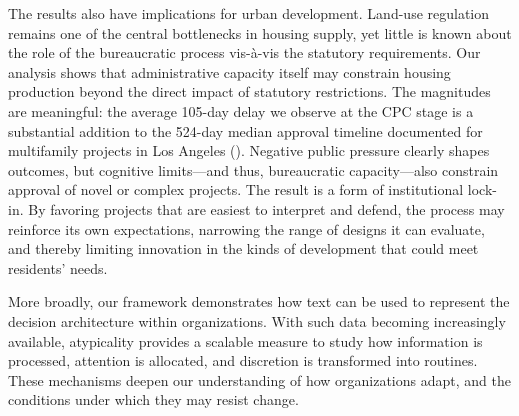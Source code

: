 The results also have implications for urban development. Land-use regulation remains one of the central bottlenecks in housing supply, yet little is known about the role of the bureaucratic process vis-\`a-vis the statutory requirements. Our analysis shows that administrative capacity itself may constrain housing production beyond the direct impact of statutory restrictions. The magnitudes are meaningful: the average 105-day delay we observe at the CPC stage is a substantial addition to the 524-day median approval timeline documented for multifamily projects in Los Angeles (\citealp{gabrielkung2025}). Negative public pressure clearly shapes outcomes, but cognitive limits---and thus, bureaucratic capacity---also constrain approval of novel or complex projects. The result is a form of institutional lock-in. By favoring projects that are easiest to interpret and defend, the process may reinforce its own expectations, narrowing the range of designs it can evaluate, and thereby limiting innovation in the kinds of development that could meet residents' needs.

More broadly, our framework demonstrates how text can be used to represent the decision architecture within organizations. With such data becoming increasingly available, atypicality provides a scalable measure to study how information is processed, attention is allocated, and discretion is transformed into routines. These mechanisms deepen our understanding of how organizations adapt, and the conditions under which they may resist change.

\pagebreak